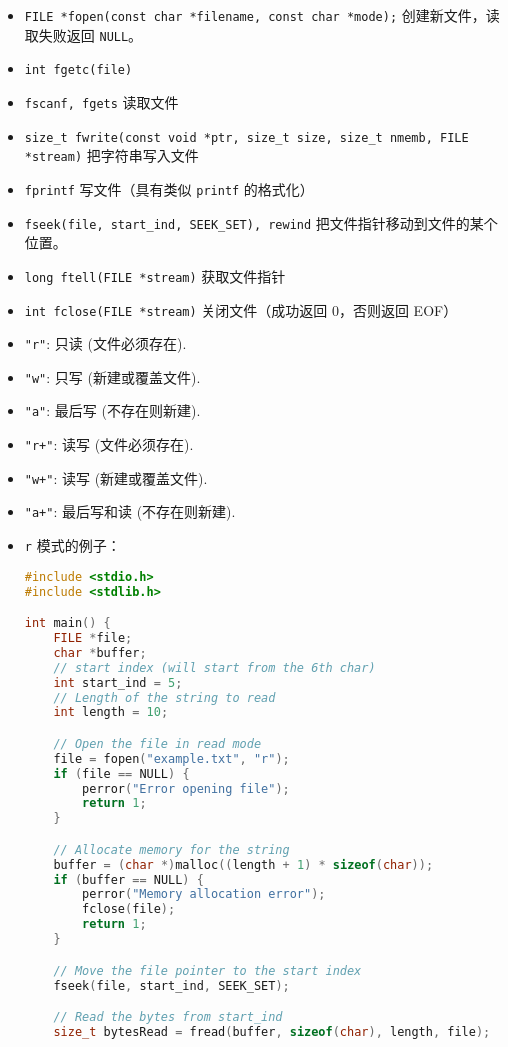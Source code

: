 
\begin{itemize}
\item \verb`FILE *fopen(const char *filename, const char *mode);` 创建新文件，读取失败返回 \verb`NULL`。
\item \verb`int fgetc(file)`
\item \verb`fscanf, fgets` 读取文件
\item \verb`size_t fwrite(const void *ptr, size_t size, size_t nmemb, FILE *stream)` 把字符串写入文件
\item \verb`fprintf` 写文件（具有类似 \verb`printf` 的格式化）
\item \verb`fseek(file, start_ind, SEEK_SET), rewind` 把文件指针移动到文件的某个位置。
\item \verb`long ftell(FILE *stream)` 获取文件指针
\item \verb`int fclose(FILE *stream)` 关闭文件（成功返回 0，否则返回 EOF）
\item \verb`"r"`: 只读 (文件必须存在).
\item \verb`"w"`: 只写 (新建或覆盖文件).
\item \verb`"a"`: 最后写 (不存在则新建).
\item \verb`"r+"`: 读写 (文件必须存在).
\item \verb`"w+"`: 读写 (新建或覆盖文件).
\item \verb`"a+"`: 最后写和读 (不存在则新建).
\item \verb`r` 模式的例子：
\begin{lstlisting}[language=cpp]
#include <stdio.h>
#include <stdlib.h>

int main() {
    FILE *file;
    char *buffer;
    // start index (will start from the 6th char)
    int start_ind = 5;
    // Length of the string to read
    int length = 10;

    // Open the file in read mode
    file = fopen("example.txt", "r");
    if (file == NULL) {
        perror("Error opening file");
        return 1;
    }

    // Allocate memory for the string
    buffer = (char *)malloc((length + 1) * sizeof(char));
    if (buffer == NULL) {
        perror("Memory allocation error");
        fclose(file);
        return 1;
    }

    // Move the file pointer to the start index
    fseek(file, start_ind, SEEK_SET);

    // Read the bytes from start_ind
    size_t bytesRead = fread(buffer, sizeof(char), length, file);


\end{lstlisting}
\end{itemize}

